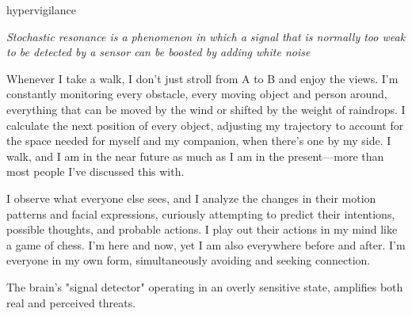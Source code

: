 



\begin{center}
\vspace*{\fill}
\Huge{hypervigilance}

\vspace{2cm}

\begin{flushright}
\large{
\textit{Stochastic resonance is a phenomenon in which a signal that is normally too weak to be detected by a sensor can be boosted by adding white noise}}
\end{flushright}

\vspace*{\fill}
\end{center}

Whenever I take a walk, I don't just stroll from A to B and enjoy the views. I'm constantly monitoring every obstacle, every moving object and person around, everything that can be moved by the wind or shifted by the weight of raindrops. I calculate the next position of every object, adjusting my trajectory to account for the space needed for myself and my companion, when there's one by my side. I walk, and I am in the near future as much as I am in the present—more than most people I've discussed this with.

I observe what everyone else sees, and I analyze the changes in their motion patterns and facial expressions, curiously attempting to predict their intentions, possible thoughts, and probable actions. I play out their actions in my mind like a game of chess. I'm here and now, yet I am also everywhere before and after. I'm everyone in my own form, simultaneously avoiding and seeking connection.

The brain’s "signal detector" operating in an overly sensitive state, amplifies both real and perceived threats.
